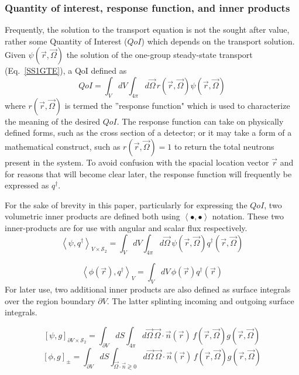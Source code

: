 \documentclass{article}
\newcommand{\vr}{\vec{r}}
\newcommand{\vO}{\vec{\Omega}}
\newcommand{\bra}{\left\langle}
\newcommand{\ket}{\right\rangle}
\newcommand{\sbra}{\left[}
\newcommand{\sket}{\right]}
\newcommand{\bound}{\partial V}
\newcommand{\vn}{\vec{n}}
\newcommand{\angResp}{q^\dag}
\newcommand{\qoi}{QoI}
\begin{document}
\subsubsection{Quantity of interest, response function, and inner products}
Frequently, the solution to the transport equation is not the sought after value, rather some Quantity of Interest ($\qoi$) which depends on the transport solution. Given $\psi(\vr,\vO)$ the solution of the one-group steady-state transport (Eq.~\eqref{SS1GTE}), a QoI
defined as
\begin{equation}
\qoi =  \int_V dV \int_{4 \pi} d \vO \,  r(\vr, \vO) \psi(\vr, \vO)
\end{equation}
where $ r(\vr, \vO)$ is termed the ''response function" which is used to characterize the meaning of the desired $\qoi$. The response function can take on physically defined forms, such as the cross section of a detector; or it may take a form of a mathematical construct, such as $r(\vr, \vO)=1$ to return the total neutrons present in the system. To avoid confusion with the spacial location vector $\vr$ and for reasons that will become clear later, the response function will frequently be expressed as $q^\dag$.

For the sake of brevity in this paper, particularly for expressing the $\qoi$, two volumetric inner products are defined both using $\bra \bullet , \bullet \ket$ notation. These two inner-products are for use with angular and scalar flux respectively. 
\begin{equation}
\bra \psi , \angResp \ket_{V \times \mathcal{S}_2}  = \int_V dV \int_{4 \pi} d \vO \,  \psi(\vr, \vO)\angResp(\vr, \vO)
\end{equation}

\begin{equation}
\bra \phi(\vr) ,\angResp \ket_V  = \int_V dV \,  \phi(\vr)\angResp(\vr)
\end{equation}
For later use, two additional inner products are also defined as surface integrals over the region boundary $\partial V$. The latter splinting incoming and outgoing surface integrals.

\begin{equation}
\sbra \psi , g \sket_{\bound \times \mathcal{S}_2}  = \int_{\bound} dS \int_{4 \pi} d \vO \, \vO \cdot \vn(\vr) \, f(\vr, \vO)g(\vr, \vO)
\end{equation}
\begin{equation}
\sbra \phi , g \sket_{\pm}   = \int_{\bound} dS \int_{\vO \cdot \vn \gtrless 0} d\vO \,  \vO \cdot \vn(\vr) \, f(\vr, \vO)g(\vr, \vO)
\end{equation}
\end{document}
